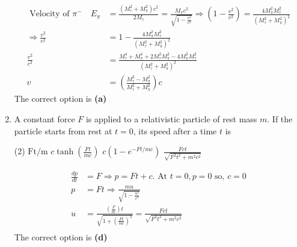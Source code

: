 \begin{enumerate}
\begin{answer}
\begin{align*}
\text { Velocity of } \pi^{-} \quad E_{\pi}&=\frac{\left(M_{\tau}^{2}+M_{\pi}^{2}\right) c^{2}}{2 M_{\tau}}=\frac{M_{\pi} c^{2}}{\sqrt{1-\frac{v^{2}}{c^{2}}}} \Rightarrow\left(1-\frac{v^{2}}{c^{2}}\right)=\frac{4 M_{\pi}^{2} M_{\tau}^{2}}{\left(M_{\tau}^{2}+M_{\pi}^{2}\right)^{2}}\\
\Rightarrow \frac{v^{2}}{c^{2}}&=1-\frac{4 M_{\pi}^{2} M_{\tau}^{2}}{\left(M_{\tau}^{2}+M_{\pi}^{2}\right)^{2}}\\
\frac{v^{2}}{c^{2}}&=\frac{M_{\tau}^{4}+M_{\pi}^{4}+2 M_{\tau}^{2} M_{\pi}^{2}-4 M_{\pi}^{2} M_{\tau}^{2}}{\left(M_{\tau}^{2}+M_{\pi}^{2}\right)^{2}}\\
v&=\left(\frac{M_{\tau}^{2}-M_{\pi}^{2}}{M_{\tau}^{2}+M_{\pi}^{2}}\right) c
\end{align*}
The correct option is \textbf{(a)}	
\end{answer}

	\item A constant force $F$ is applied to a relativistic particle of rest mass $m$. If the particle starts from rest at $t=0$, its speed after a time $t$ is
	{}
\begin{tasks}(2)
	\task[\textbf{A.}] $\mathrm{Ft} / \mathrm{m}$
	\task[\textbf{B.}]$c \tanh \left(\frac{F t}{m c}\right)$
	\task[\textbf{C.}]$c\left(1-e^{-F t / m c}\right)$
	\task[\textbf{D.}]$\frac{F c t}{\sqrt{F^{2} t^{2}+m^{2} c^{2}}}$
\end{tasks}
\begin{answer}
	\begin{align*}
	\frac{d p}{d t}&=F \Rightarrow p=F t+c . \text { At } t=0, p=0 \text { so, } c=0\\
	p&=F t \Rightarrow \frac{m u}{\sqrt{1-\frac{u^{2}}{c^{2}}}}\\
	u&=\frac{\left(\frac{F}{m}\right) t}{\sqrt{1+\left(\frac{F t}{m c}\right)^{2}}}=\frac{F c t}{\sqrt{F^{2} t^{2}+m^{2} c^{2}}}\\
	\end{align*}
	The correct option is \textbf{(d)}
\end{answer}


\end{enumerate}
